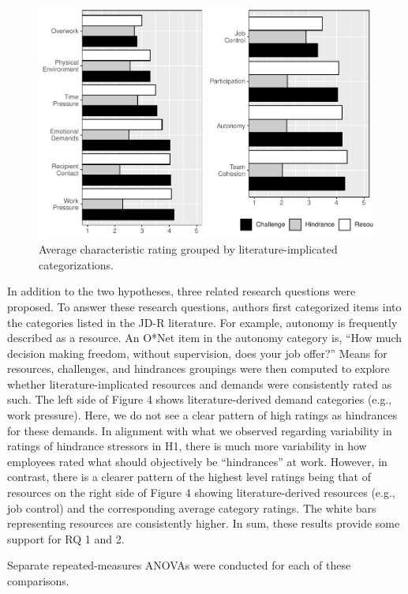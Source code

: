 \documentclass[
  english,
  man]{apa6}
\begin{document}
\begin{figure}
\centering
\includegraphics{Submission_files/figure-latex/scalelevelgraphs-1.pdf}
\caption{\label{fig:scalelevelgraphs}Average characteristic rating grouped by literature-implicated categorizations.}
\end{figure}

In addition to the two hypotheses, three related research questions were proposed. To answer these research questions, authors first categorized items into the categories listed in the JD-R literature. For example, autonomy is frequently described as a resource. An O*Net item in the autonomy category is, ``How much decision making freedom, without supervision, does your job offer?'' Means for resources, challenges, and hindrances groupings were then computed to explore whether literature-implicated resources and demands were consistently rated as such. The left side of Figure 4 shows literature-derived demand categories (e.g., work pressure). Here, we do not see a clear pattern of high ratings as hindrances for these demands. In alignment with what we observed regarding variability in ratings of hindrance stressors in H1, there is much more variability in how employees rated what should objectively be ``hindrances'' at work. However, in contrast, there is a clearer pattern of the highest level ratings being that of resources on the right side of Figure 4 showing literature-derived resources (e.g., job control) and the corresponding average category ratings. The white bars representing resources are consistently higher. In sum, these results provide some support for RQ 1 and 2.

Separate repeated-measures ANOVAs were conducted for each of these comparisons.
\end{document}
